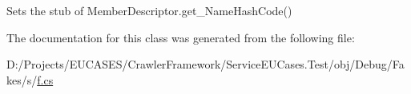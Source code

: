 Sets the stub of Member\-Descriptor.\-get\-\_\-\-Name\-Hash\-Code()



The documentation for this class was generated from the following file\-:\begin{DoxyCompactItemize}
\item 
D\-:/\-Projects/\-E\-U\-C\-A\-S\-E\-S/\-Crawler\-Framework/\-Service\-E\-U\-Cases.\-Test/obj/\-Debug/\-Fakes/s/\hyperlink{s_2f_8cs}{f.\-cs}\end{DoxyCompactItemize}
